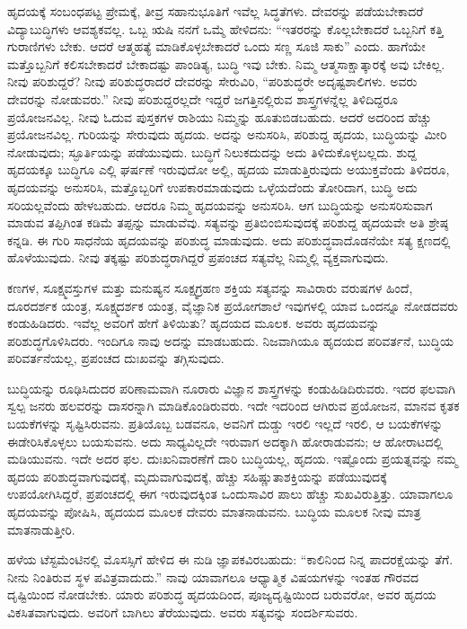 ಹೃದಯಕ್ಕೆ ಸಂಬಂಧಪಟ್ಟ ಪ್ರೇಮಕ್ಕೆ, ತೀವ್ರ ಸಹಾನುಭೂತಿಗೆ ಇವೆಲ್ಲ ಸಿದ್ಧತೆಗಳು. ದೇವರನ್ನು ಪಡೆಯಬೇಕಾದರೆ ವಿದ್ಯಾಬುದ್ಧಿಗಳು ಆವಶ್ಯಕವಲ್ಲ. ಒಬ್ಬ ಋಷಿ ನನಗೆ ಒಮ್ಮೆ ಹೇಳಿದನು: “ಇತರರನ್ನು ಕೊಲ್ಲಬೇಕಾದರೆ ಒಬ್ಬನಿಗೆ ಕತ್ತಿ ಗುರಾಣಿಗಳು ಬೇಕು. ಆದರೆ ಆತ್ಮಹತ್ಯೆ ಮಾಡಿಕೊಳ್ಳಬೇಕಾದರೆ ಒಂದು ಸಣ್ಣ ಸೂಜಿ ಸಾಕು” ಎಂದು. ಹಾಗೆಯೇ ಮತ್ತೊಬ್ಬನಿಗೆ ಕಲಿಸಬೇಕಾದರೆ ಬೇಕಾದಷ್ಟು ಪಾಂಡಿತ್ಯ, ಬುದ್ಧಿ ಇವು ಬೇಕು. ನಿಮ್ಮ ಆತ್ಮಸಾಕ್ಷಾತ್ಕಾರಕ್ಕೆ ಅವು ಬೇಕಿಲ್ಲ. ನೀವು ಪರಿಶುದ್ದರೆ? ನೀವು ಪರಿಶುದ್ಧರಾದರೆ ದೇವರನ್ನು ಸೇರುವಿರಿ, “ಪರಿಶುದ್ಧರೇ ಅದೃಷ್ಟಶಾಲಿಗಳು. ಅವರು ದೇವರನ್ನು ನೋಡುವರು.” ನೀವು ಪರಿಶುದ್ದರಲ್ಲದೇ ಇದ್ದರೆ ಜಗತ್ತಿನಲ್ಲಿರುವ ಶಾಸ್ತ್ರಗಳನ್ನೆಲ್ಲ ತಿಳಿದಿದ್ದರೂ ಪ್ರಯೋಜನವಿಲ್ಲ. ನೀವು ಓದುವ ಪುಸ್ತಕಗಳ ರಾಶಿಯು ನಿಮ್ಮನ್ನು ಹೂತುಬಿಡಬಹುದು. ಆದರೆ ಅದರಿಂದ ಹೆಚ್ಚು ಪ್ರಯೋಜನವಿಲ್ಲ. ಗುರಿಯನ್ನು ಸೇರುವುದು ಹೃದಯ. ಅದನ್ನು ಅನುಸರಿಸಿ, ಪರಿಶುದ್ದ ಹೃದಯ, ಬುದ್ಧಿಯನ್ನು ಮೀರಿ ನೋಡುವುದು; ಸ್ಫೂರ್ತಿಯನ್ನು ಪಡೆಯುವುದು. ಬುದ್ಧಿಗೆ ನಿಲುಕದುದನ್ನು ಅದು ತಿಳಿದುಕೊಳ್ಳಬಲ್ಲದು. ಶುದ್ದ ಹೃದಯಕ್ಕೂ ಬುದ್ಧಿಗೂ ಎಲ್ಲಿ ಘರ್ಷಣೆ ಇರುವುದೋ ಅಲ್ಲಿ, ಹೃದಯ ಮಾಡುತ್ತಿರುವುದು ಅಯುಕ್ತವೆಂದು ತಿಳಿದರೂ, ಹೃದಯವನ್ನು ಅನುಸರಿಸಿ, ಮತ್ತೊಬ್ಬರಿಗೆ ಉಪಕಾರಮಾಡುವುದು ಒಳ್ಳೆಯದೆಂದು ತೋರಿದಾಗ, ಬುದ್ಧಿ ಅದು ಸರಿಯಲ್ಲವೆಂದು ಹೇಳಬಹುದು. ಆದರೂ ನಿಮ್ಮ ಹೃದಯವನ್ನು ಅನುಸರಿಸಿ. ಆಗ ಬುದ್ಧಿಯನ್ನು ಅನುಸರಿಸುವಾಗ ಮಾಡುವ ತಪ್ಪಿಗಿಂತ ಕಡಿಮೆ ತಪ್ಪನ್ನು ಮಾಡುವೆವು. ಸತ್ಯವನ್ನು ಪ್ರತಿಬಿಂಬಿಸುವುದಕ್ಕೆ ಪರಿಶುದ್ದ ಹೃದಯವೇ ಅತಿ ಶ್ರೇಷ್ಠ ಕನ್ನಡಿ. ಈ ಗುರಿ ಸಾಧನೆಯ ಹೃದಯವನ್ನು ಪರಿಶುದ್ಧ ಮಾಡುವುದು. ಅದು ಪರಿಶುದ್ಧವಾದೊಡನೆಯೇ ಸತ್ಯ ಕ್ಷಣದಲ್ಲಿ ಹೊಳೆಯುವುದು. ನೀವು ತಕ್ಕಷ್ಟು ಪರಿಶುದ್ಧರಾಗಿದ್ದರೆ ಪ್ರಪಂಚದ ಸತ್ಯವೆಲ್ಲ ನಿಮ್ಮಲ್ಲಿ ವ್ಯಕ್ತವಾಗುವುದು.

ಕಣಗಳ, ಸೂಕ್ಷ್ಮವಸ್ತುಗಳ ಮತ್ತು ಮನುಷ್ಯನ ಸೂಕ್ಷ್ಮಗ್ರಹಣ ಶಕ್ತಿಯ ಸತ್ಯವನ್ನು ಸಾವಿರಾರು ವರುಷಗಳ ಹಿಂದೆ, ದೂರದರ್ಶಕ ಯಂತ್ರ, ಸೂಕ್ಷ್ಮದರ್ಶಕ ಯಂತ್ರ, ವೈಜ್ಞಾನಿಕ ಪ್ರಯೋಗಶಾಲೆ ಇವುಗಳಲ್ಲಿ ಯಾವ ಒಂದನ್ನೂ ನೋಡದವರು ಕಂಡುಹಿಡಿದರು. ಇವೆಲ್ಲ ಅವರಿಗೆ ಹೇಗೆ ತಿಳಿಯಿತು? ಹೃದಯದ ಮೂಲಕ. ಅವರು ಹೃದಯವನ್ನು ಪರಿಶುದ್ಧಗೊಳಿಸಿದರು. ಇಂದಿಗೂ ನಾವು ಅದನ್ನು ಮಾಡಬಹುದು. ನಿಜವಾಗಿಯೂ ಹೃದಯದ ಪರಿವರ್ತನೆ, ಬುದ್ಧಿಯ ಪರಿವರ್ತನೆಯಲ್ಲ, ಪ್ರಪಂಚದ ದುಃಖವನ್ನು ತಗ್ಗಿಸುವುದು.

ಬುದ್ಧಿಯನ್ನು ರೂಢಿಸಿದುದರ ಪರಿಣಾಮವಾಗಿ ನೂರಾರು ವಿಜ್ಞಾನ ಶಾಸ್ತ್ರಗಳನ್ನು ಕಂಡುಹಿಡಿದಿರುವರು. ಇದರ ಫಲವಾಗಿ ಸ್ವಲ್ಪ ಜನರು ಹಲವರನ್ನು ದಾಸರನ್ನಾಗಿ ಮಾಡಿಕೊಂಡಿರುವರು. ಇದೇ ಇದರಿಂದ ಆಗಿರುವ ಪ್ರಯೋಜನ, ಮಾನವ ಕೃತಕ ಬಯಕೆಗಳನ್ನು ಸೃಷ್ಟಿಸಿರುವನು. ಪ್ರತಿಯೊಬ್ಬ ಬಡವನೂ, ಅವನಿಗೆ ದುಡ್ಡು ಇರಲಿ ಇಲ್ಲದೆ ಇರಲಿ, ಆ ಬಯಕೆಗಳನ್ನು ಈಡೇರಿಸಿಕೊಳ್ಳಲು ಬಯಸುವನು. ಅದು ಸಾಧ್ಯವಿಲ್ಲದೇ ಇರುವಾಗ ಅದಕ್ಕಾಗಿ ಹೋರಾಡುವನು; ಆ ಹೋರಾಟದಲ್ಲಿ ಮಡಿಯುವನು. ಇದೇ ಅದರ ಫಲ. ದುಃಖನಿವಾರಣೆಗೆ ದಾರಿ ಬುದ್ಧಿಯಲ್ಲ, ಹೃದಯ. ಇಷ್ಟೊಂದು ಪ್ರಯತ್ನವನ್ನು ನಮ್ಮ ಹೃದಯ ಪರಿಶುದ್ಧವಾಗುವುದಕ್ಕೆ, ಮೃದುವಾಗುವುದಕ್ಕೆ, ಹೆಚ್ಚು ಸಹಿಷ್ಣುತಾಶಕ್ತಿಯನ್ನು ಪಡೆಯುವುದಕ್ಕೆ ಉಪಯೋಗಿಸಿದ್ದರೆ, ಪ್ರಪಂಚದಲ್ಲಿ ಈಗ ಇರುವುದಕ್ಕಿಂತ ಒಂದುಸಾವಿರ ಪಾಲು ಹೆಚ್ಚು ಸುಖವಿರುತ್ತಿತ್ತು. ಯಾವಾಗಲೂ ಹೃದಯವನ್ನು ಪೋಷಿಸಿ, ಹೃದಯದ ಮೂಲಕ ದೇವರು ಮಾತನಾಡುವನು. ಬುದ್ಧಿಯ ಮೂಲಕ ನೀವು ಮಾತ್ರ ಮಾತನಾಡುತ್ತೀರಿ.

ಹಳೆಯ ಟೆಸ್ಟಮೆಂಟಿನಲ್ಲಿ ಮೊಸಸ್ಸಿಗೆ ಹೇಳಿದ ಈ ನುಡಿ ಜ್ಞಾಪಕವಿರಬಹುದು: “ಕಾಲಿನಿಂದ ನಿನ್ನ ಪಾದರಕ್ಷೆಯನ್ನು ತೆಗೆ. ನೀನು ನಿಂತಿರುವ ಸ್ಥಳ ಪವಿತ್ರವಾದುದು.'' ನಾವು ಯಾವಾಗಲೂ ಆಧ್ಯಾತ್ಮಿಕ ವಿಷಯಗಳನ್ನು ಇಂತಹ ಗೌರವದ ದೃಷ್ಟಿಯಿಂದ ನೋಡಬೇಕು. ಯಾರು ಪರಿಶುದ್ಧ ಹೃದಯದಿಂದ, ಪೂಜ್ಯದೃಷ್ಟಿಯಿಂದ ಬರುವರೋ, ಅವರ ಹೃದಯ ವಿಕಸಿತವಾಗುವುದು. ಅವರಿಗೆ ಬಾಗಿಲು ತೆರೆಯುವುದು. ಅವರು ಸತ್ಯವನ್ನು ಸಂದರ್ಶಿಸುವರು.

